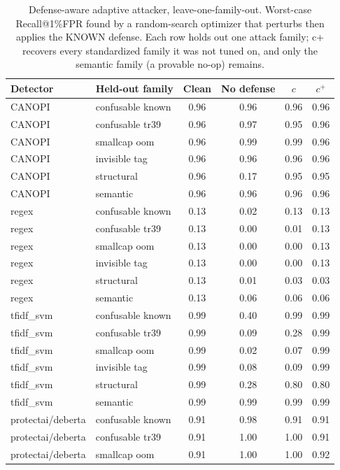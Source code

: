 \begin{table}[ht]\centering
\caption{Defense-aware adaptive attacker, leave-one-family-out. Worst-case Recall@1\%FPR found by a random-search optimizer that perturbs then applies the KNOWN defense. Each row holds out one attack family; c+ recovers every standardized family it was not tuned on, and only the semantic family (a provable no-op) remains.}
\label{tab:adaptive_v2}
\small
\begin{tabular}{ll cccc}
\toprule
Detector & Held-out family & Clean & No defense & $c$ & $c^{+}$ \\
\midrule
CANOPI & confusable known & 0.96 & 0.96 & 0.96 & 0.96 \\
CANOPI & confusable tr39 & 0.96 & 0.97 & 0.95 & 0.96 \\
CANOPI & smallcap oom & 0.96 & 0.99 & 0.99 & 0.96 \\
CANOPI & invisible tag & 0.96 & 0.96 & 0.96 & 0.96 \\
CANOPI & structural & 0.96 & 0.17 & 0.95 & 0.95 \\
CANOPI & semantic & 0.96 & 0.96 & 0.96 & 0.96 \\
regex & confusable known & 0.13 & 0.02 & 0.13 & 0.13 \\
regex & confusable tr39 & 0.13 & 0.00 & 0.01 & 0.13 \\
regex & smallcap oom & 0.13 & 0.00 & 0.00 & 0.13 \\
regex & invisible tag & 0.13 & 0.00 & 0.00 & 0.13 \\
regex & structural & 0.13 & 0.01 & 0.03 & 0.03 \\
regex & semantic & 0.13 & 0.06 & 0.06 & 0.06 \\
tfidf_svm & confusable known & 0.99 & 0.40 & 0.99 & 0.99 \\
tfidf_svm & confusable tr39 & 0.99 & 0.09 & 0.28 & 0.99 \\
tfidf_svm & smallcap oom & 0.99 & 0.02 & 0.07 & 0.99 \\
tfidf_svm & invisible tag & 0.99 & 0.08 & 0.09 & 0.99 \\
tfidf_svm & structural & 0.99 & 0.28 & 0.80 & 0.80 \\
tfidf_svm & semantic & 0.99 & 0.99 & 0.99 & 0.99 \\
protectai/deberta & confusable known & 0.91 & 0.98 & 0.91 & 0.91 \\
protectai/deberta & confusable tr39 & 0.91 & 1.00 & 1.00 & 0.91 \\
protectai/deberta & smallcap oom & 0.91 & 1.00 & 1.00 & 0.92 \\

\end{tabular}
\end{table}

